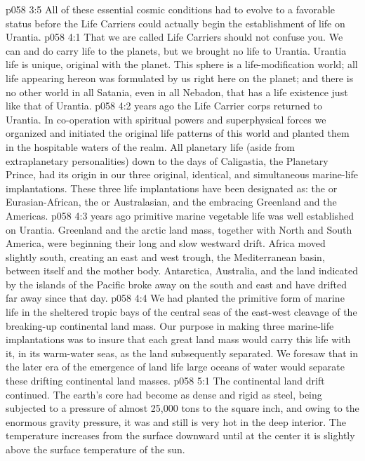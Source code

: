 \pc \vs p058 3:5 All of these essential cosmic conditions had to evolve to a favorable status before the Life Carriers could actually begin the establishment of life on Urantia.
\vs p058 4:1 That we are called Life Carriers should not confuse you. We can and do carry life to the planets, but we brought no life to Urantia. Urantia life is unique, original with the planet. This sphere is a life\hyp{}modification world; all life appearing hereon was formulated by us right here on the planet; and there is no other world in all Satania, even in all Nebadon, that has a life existence just like that of Urantia.\plusone
\pc \vs p058 4:2  years ago the Life Carrier corps returned to Urantia. In co\hyp{}operation with spiritual powers and superphysical forces we organized and initiated the original life patterns of this world and planted them in the hospitable waters of the realm. All planetary life (aside from extraplanetary personalities) down to the days of Caligastia, the Planetary Prince, had its origin in our three original, identical, and simultaneous marine\hyp{}life implantations. These three life implantations have been designated as: the  or Eurasian\hyp{}African, the  or Australasian, and the  embracing Greenland and the Americas.
\pc \vs p058 4:3  years ago primitive marine vegetable life was well established on Urantia. Greenland and the arctic land mass, together with North and South America, were beginning their long and slow westward drift. Africa moved slightly south, creating an east and west trough, the Mediterranean basin, between itself and the mother body. Antarctica, Australia, and the land indicated by the islands of the Pacific broke away on the south and east and have drifted far away since that day.
\vs p058 4:4 We had planted the primitive form of marine life in the sheltered tropic bays of the central seas of the east\hyp{}west cleavage of the breaking\hyp{}up continental land mass. Our purpose in making three marine\hyp{}life implantations was to insure that each great land mass would carry this life with it, in its warm\hyp{}water seas, as the land subsequently separated. We foresaw that in the later era of the emergence of land life large oceans of water would separate these drifting continental land masses.
\vs p058 5:1 The continental land drift continued. The earth’s core had become as dense and rigid as steel, being subjected to a pressure of almost 25,000 tons to the square inch, and owing to the enormous gravity pressure, it was and still is very hot in the deep interior. The temperature increases from the surface downward until at the center it is slightly above the surface temperature of the sun.
